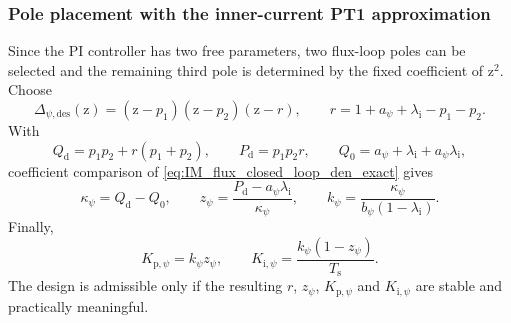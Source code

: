 \begin{frame}
    \frametitle{Pole placement with the inner-current PT1 approximation}
    Since the PI controller has two free parameters, two flux-loop poles can be selected and the remaining third pole is determined by the fixed coefficient of $\mathrm{z}^2$. Choose
    \begin{equation}
        \Delta_{\psi,\mathrm{des}}(\mathrm{z})=(\mathrm{z}-p_1)(\mathrm{z}-p_2)(\mathrm{z}-r),
        \qquad
        r=1+a_\psi+\lambda_\mathrm{i}-p_1-p_2 .
        \label{eq:IM_flux_desired_cubic}
    \end{equation}\pause%
    With
    \begin{equation}
        Q_\mathrm{d}=p_1p_2+r(p_1+p_2),
        \qquad
        P_\mathrm{d}=p_1p_2r,
        \qquad
        Q_0=a_\psi+\lambda_\mathrm{i}+a_\psi\lambda_\mathrm{i},
        \label{eq:IM_flux_pole_aux}
    \end{equation}
    coefficient comparison of \eqref{eq:IM_flux_closed_loop_den_exact} gives
    \begin{equation}
        \kappa_\psi=Q_\mathrm{d}-Q_0,
        \qquad
        z_\psi=\frac{P_\mathrm{d}-a_\psi\lambda_\mathrm{i}}{\kappa_\psi},
        \qquad
        k_\psi=\frac{\kappa_\psi}{b_\psi(1-\lambda_\mathrm{i})} .
        \label{eq:IM_flux_exact_pole_placement}
    \end{equation}\pause%
    Finally,
    \begin{equation}
        K_{\mathrm{p},\psi}=k_\psi z_\psi,
        \qquad
        K_{\mathrm{i},\psi}=\frac{k_\psi(1-z_\psi)}{T_\mathrm{s}} .
        \label{eq:IM_flux_exact_PI_gains}
    \end{equation}
    The design is admissible only if the resulting $r$, $z_\psi$, $K_{\mathrm{p},\psi}$ and $K_{\mathrm{i},\psi}$ are stable and practically meaningful.
\end{frame}

